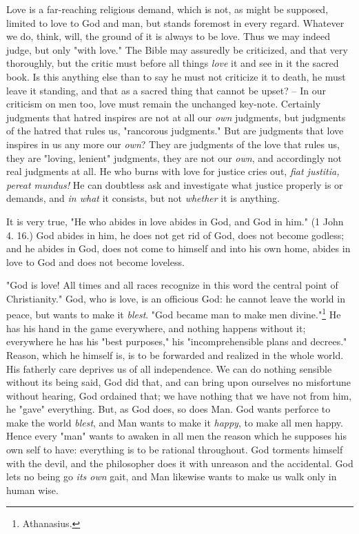 \documentclass[a4paper]{book}
\begin{document}
Love is a far-reaching religious demand, which is not, as might be supposed, 
limited to love to God and man, but stands foremost in every regard. Whatever 
we do, think, will, the ground of it is always to be love. Thus we may indeed 
judge, but only "{}with love."{} The Bible may assuredly be criticized, and 
that very thoroughly, but the critic must before all things \textit{love} it 
and see in it the sacred book. Is this anything else than to say he must not 
criticize it to death, he must leave it standing, and that as a sacred thing 
that cannot be upset? -- In our criticism on men too, love must remain the 
unchanged key-note. Certainly judgments that hatred inspires are not at all 
our \textit{own} judgments, but judgments of the hatred that rules us, 
"{}rancorous judgments."{} But are judgments that love inspires in us any more 
our \textit{own}? They are judgments of the love that rules us, they are 
"{}loving, lenient"{} judgments, they are not our \textit{own}, and 
accordingly not real judgments at all. He who burns with love for justice 
cries out, \textit{fiat justitia, pereat mundus!} He can doubtless ask and 
investigate what justice properly is or demands, and \textit{in what} it 
consists, but not \textit{whether} it is anything.

It is very true, "{}He who abides in love abides in God, and God in him."{} (1 
John 4. 16.) God abides in him, he does not get rid of God, does not become 
godless; and he abides in God, does not come to himself and into his own home, 
abides in love to God and does not become loveless.

"{}God is love! All times and all races recognize in this word the central 
point of Christianity."{} God, who is love, is an officious God: he cannot 
leave the world in peace, but wants to make it \textit{blest}. "{}God became 
man to make men divine."{}\footnote{Athanasius.} He has his hand in the game 
everywhere, and nothing happens without it; everywhere he has his "{}best 
purposes,"{} his "{}incomprehensible plans and decrees."{} Reason, which he 
himself is, is to be forwarded and realized in the whole world. His fatherly 
care deprives us of all independence. We can do nothing sensible without its 
being said, God did that, and can bring upon ourselves no misfortune without 
hearing, God ordained that; we have nothing that we have not from him, he 
"{}gave"{} everything. But, as God does, so does Man. God wants perforce to 
make the world \textit{blest}, and Man wants to make it \textit{happy}, to 
make all men happy. Hence every "{}man"{} wants to awaken in all men the 
reason which he supposes his own self to have: everything is to be rational 
throughout. God torments himself with the devil, and the philosopher does it 
with unreason and the accidental. God lets no being go \textit{its own} gait, 
and Man likewise wants to make us walk only in human wise.
\end{document}
